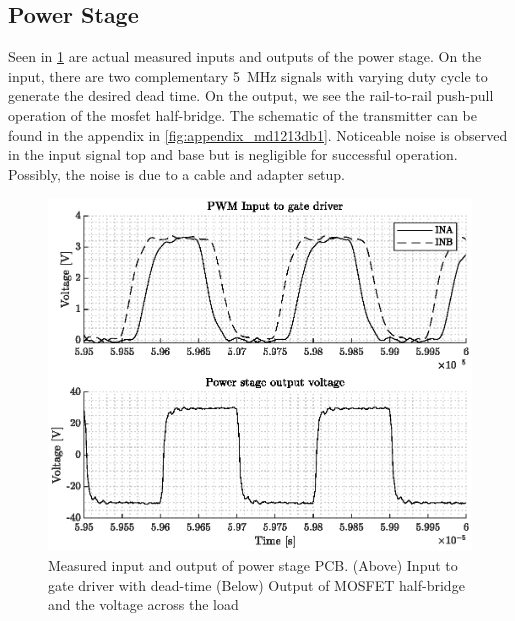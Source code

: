 \subsection{Power Stage}
Seen in \cref{fig:4_transmitter_meas} are actual measured inputs and outputs of the power stage. On the input, there are two complementary \qty{5}{\mega\hertz} signals with varying duty cycle to generate the desired dead time. On the output, we see the rail-to-rail push-pull operation of the \gls{mosfet} half-bridge. The schematic of the transmitter can be found in the appendix in \cref{fig:appendix_md1213db1}. Noticeable noise is observed in the input signal top and base but is negligible for successful operation. Possibly, the noise is due to a cable and adapter setup.
\begin{figure}[htbp]
	\centering
	\includegraphics[width=.8\textwidth]{Figures/4_transmitter_pcb_out.eps}
	\caption[Measured input and output of power stage PCB]{Measured input and output of power stage PCB. (Above) Input to gate driver with dead-time (Below) Output of MOSFET half-bridge and the voltage across the load}
	\label{fig:4_transmitter_meas}
\end{figure}

